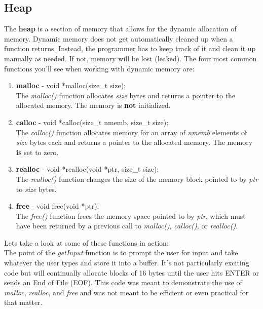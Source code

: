 \documentclass[../main.tex]{subfiles}
\begin{document}
	\subsection{Heap}
	The \textbf{heap} is a section of memory that allows for the dynamic allocation of memory.  Dynamic memory does not get automatically cleaned up when a function returns.  Instead, the programmer has to keep track of it and clean it up manually as needed.  If not, memory will be lost (leaked).  The four most common functions you'll see when working with dynamic memory are:
	
	\begin{enumerate}
		\item \textbf{malloc} - void *malloc(size\_t size); \\ The  \textit{malloc()} function allocates \textit{size} bytes and returns a pointer to the allocated memory.  The memory is \textbf{not} initialized.
		\item \textbf{calloc} - void *calloc(size\_t nmemb, size\_t size); \\ The  \textit{calloc()} function allocates memory for an array of \textit{nmemb} elements of \textit{size} bytes each and returns a pointer to the allocated memory.  The memory \textbf{is} set to zero.
		\item \textbf{realloc} - void *realloc(void *ptr, size\_t size); \\ The  \textit{realloc()}  function  changes the size of the memory block pointed to by \textit{ptr} to \textit{size} bytes.
		\item \textbf{free} - void free(void *ptr); \\ The \textit{free()} function frees the memory space pointed to by \textit{ptr}, which must have been returned by a previous call to \textit{malloc()}, \textit{calloc()}, or \textit{realloc()}.
	\end{enumerate}
	
	Lets take a look at some of these functions in action:\\
	
	
	
	The point of the \textit{getInput} function is to prompt the user for input and take whatever the user types and store it into a buffer.  It's not particularly exciting code but will continually allocate blocks of 16 bytes until the user hits ENTER or sends an End of File (EOF).  This code was meant to demonstrate the use of \textit{malloc}, \textit{realloc}, and \textit{free} and was not meant to be efficient or even practical for that matter.  
	
\end{document}
